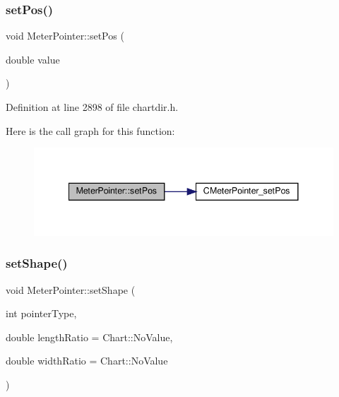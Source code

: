 \subsubsection{\texorpdfstring{set\+Pos()}{setPos()}}
{\footnotesize\ttfamily void Meter\+Pointer\+::set\+Pos (\begin{DoxyParamCaption}\item[{double}]{value }\end{DoxyParamCaption})\hspace{0.3cm}{\ttfamily [inline]}}



Definition at line 2898 of file chartdir.\+h.

Here is the call graph for this function\+:
\nopagebreak
\begin{figure}[H]
\begin{center}
\leavevmode
\includegraphics[width=341pt]{class_meter_pointer_ac76bcf974ea61a13867aef4e83c02a48_cgraph}
\end{center}
\end{figure}
\mbox{\label{class_meter_pointer_a597012c2677c3f1f05501ae8ce7ea743}} 
\subsubsection{\texorpdfstring{set\+Shape()}{setShape()}\hspace{0.1cm}{\footnotesize\ttfamily [1/2]}}
{\footnotesize\ttfamily void Meter\+Pointer\+::set\+Shape (\begin{DoxyParamCaption}\item[{int}]{pointer\+Type,  }\item[{double}]{length\+Ratio = {\ttfamily Chart\+:\+:NoValue},  }\item[{double}]{width\+Ratio = {\ttfamily Chart\+:\+:NoValue} }\end{DoxyParamCaption})\hspace{0.3cm}{\ttfamily [inline]}}



